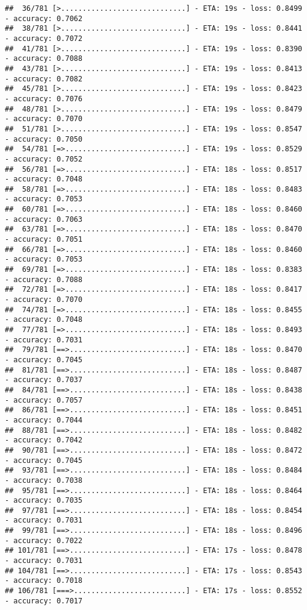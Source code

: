 \documentclass[
]{article}
\begin{document}
\begin{verbatim}
##  36/781 [>.............................] - ETA: 19s - loss: 0.8499 - accuracy: 0.7062
##  38/781 [>.............................] - ETA: 19s - loss: 0.8441 - accuracy: 0.7072
##  41/781 [>.............................] - ETA: 19s - loss: 0.8390 - accuracy: 0.7088
##  43/781 [>.............................] - ETA: 19s - loss: 0.8413 - accuracy: 0.7082
##  45/781 [>.............................] - ETA: 19s - loss: 0.8423 - accuracy: 0.7076
##  48/781 [>.............................] - ETA: 19s - loss: 0.8479 - accuracy: 0.7070
##  51/781 [>.............................] - ETA: 19s - loss: 0.8547 - accuracy: 0.7050
##  54/781 [=>............................] - ETA: 19s - loss: 0.8529 - accuracy: 0.7052
##  56/781 [=>............................] - ETA: 18s - loss: 0.8517 - accuracy: 0.7048
##  58/781 [=>............................] - ETA: 18s - loss: 0.8483 - accuracy: 0.7053
##  60/781 [=>............................] - ETA: 18s - loss: 0.8460 - accuracy: 0.7063
##  63/781 [=>............................] - ETA: 18s - loss: 0.8470 - accuracy: 0.7051
##  66/781 [=>............................] - ETA: 18s - loss: 0.8460 - accuracy: 0.7053
##  69/781 [=>............................] - ETA: 18s - loss: 0.8383 - accuracy: 0.7088
##  72/781 [=>............................] - ETA: 18s - loss: 0.8417 - accuracy: 0.7070
##  74/781 [=>............................] - ETA: 18s - loss: 0.8455 - accuracy: 0.7048
##  77/781 [=>............................] - ETA: 18s - loss: 0.8493 - accuracy: 0.7031
##  79/781 [==>...........................] - ETA: 18s - loss: 0.8470 - accuracy: 0.7045
##  81/781 [==>...........................] - ETA: 18s - loss: 0.8487 - accuracy: 0.7037
##  84/781 [==>...........................] - ETA: 18s - loss: 0.8438 - accuracy: 0.7057
##  86/781 [==>...........................] - ETA: 18s - loss: 0.8451 - accuracy: 0.7044
##  88/781 [==>...........................] - ETA: 18s - loss: 0.8482 - accuracy: 0.7042
##  90/781 [==>...........................] - ETA: 18s - loss: 0.8472 - accuracy: 0.7045
##  93/781 [==>...........................] - ETA: 18s - loss: 0.8484 - accuracy: 0.7038
##  95/781 [==>...........................] - ETA: 18s - loss: 0.8464 - accuracy: 0.7035
##  97/781 [==>...........................] - ETA: 18s - loss: 0.8454 - accuracy: 0.7031
##  99/781 [==>...........................] - ETA: 18s - loss: 0.8496 - accuracy: 0.7022
## 101/781 [==>...........................] - ETA: 17s - loss: 0.8478 - accuracy: 0.7031
## 104/781 [==>...........................] - ETA: 17s - loss: 0.8543 - accuracy: 0.7018
## 106/781 [===>..........................] - ETA: 17s - loss: 0.8552 - accuracy: 0.7017

\end{verbatim}
\end{document}

